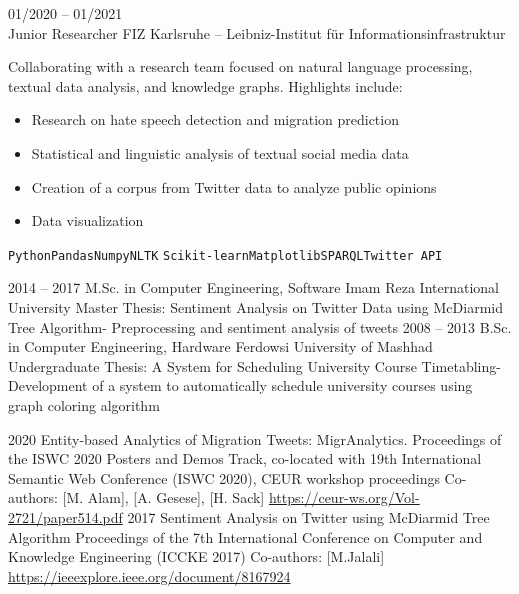 \documentclass[9pt]{developercv} %
\begin{document}
\begin{entrylist}
{        }
    	\entry
    		{01/2020 -- 01/2021\\}
    		{Junior Researcher}
    		{FIZ Karlsruhe – Leibniz-Institut für Informationsinfrastruktur}
    		{Collaborating with a research team focused on natural language processing, textual data analysis, and knowledge graphs. Highlights include:
            \begin{itemize}
                \item Research on hate speech detection and migration prediction
                \item Statistical and linguistic analysis of textual social media data
                \item Creation of a corpus from Twitter data to analyze public opinions
                \item Data visualization
            \end{itemize}
            \texttt{Python}\slashsep\texttt{Pandas}\slashsep\texttt{Numpy}\slashsep\texttt{NLTK}\slashsep
            \texttt{Scikit-learn}\slashsep\texttt{Matplotlib}\slashsep\texttt{SPARQL}\slashsep\texttt{Twitter API}
            }
    \end{entrylist}


    \pagebreak
	\begin{entrylist}
		\entry
		{2014 – 2017}
		{M.Sc. in Computer Engineering, Software}
		{Imam Reza International University}
		{Master Thesis: Sentiment Analysis on Twitter Data using McDiarmid Tree Algorithm- Preprocessing and sentiment analysis of tweets}
		\entry
		{2008 – 2013}
		{B.Sc. in Computer Engineering, Hardware}
		{Ferdowsi University of Mashhad}
		{Undergraduate Thesis: A System for Scheduling University Course Timetabling- Development of a system to automatically schedule university courses using graph coloring algorithm}
	\end{entrylist}

	\cvsect{Publications}
    \begin{entrylist}
        \entry
        {2020}
        {Entity-based Analytics of Migration Tweets: MigrAnalytics.}
        {Proceedings of the ISWC 2020 Posters and Demos Track, co-located with 19th International Semantic Web Conference (ISWC 2020), CEUR workshop proceedings}
        {Co-authors: [M. Alam], [A. Gesese], [H. Sack]}
        {\href{Link}{https://ceur-ws.org/Vol-2721/paper514.pdf}}
        \entry
        {2017}
        {Sentiment Analysis on Twitter using McDiarmid Tree Algorithm}
        {Proceedings of the 7th International Conference on Computer and Knowledge Engineering (ICCKE 2017)}
        {Co-authors: [M.Jalali]}
        {\href{Link}{https://ieeexplore.ieee.org/document/8167924}}
    \end{entrylist}
\end{document}
